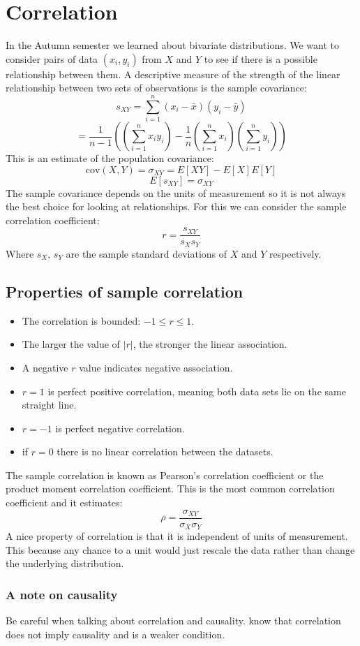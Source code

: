 \documentclass[12pt]{article}
\begin{document}
\section{Correlation}
In the Autumn semester we learned about bivariate distributions. We want to consider pairs of data \((x_i,y_i)\) from \(X\) and \(Y\) to see if there is a possible relationship between them. A descriptive measure of the strength of the linear relationship between two sets of observations is the sample covariance:
\[s_{XY}=\sum^n_{i=1}(x_i-\bar{x})(y_i-\bar{y})\]
\[=\frac{1}{n-1}\left(\left(\sum^n_{i=1}x_iy_i\right)-\frac{1}{n}\left(\sum^n_{i=1}x_i\right)\left(\sum^n_{i=1}y_i\right)\right)\]
This is an estimate of the population covariance:
\[\text{cov}(X,Y)=\sigma_{XY}=E[XY]-E[X]E[Y]\]
\[E[s_{XY}]=\sigma_{XY}\]
The sample covariance depends on the units of measurement so it is not always the best choice for looking at relationships. For this we can consider the sample correlation coefficient:
\[r=\frac{s_{XY}}{s_Xs_{Y}}\]
Where \(s_X,\,s_Y\) are the sample standard deviations of \(X\) and \(Y\) respectively.
\subsection*{Properties of sample correlation}
\begin{itemize}
    \item The correlation is bounded: \(-1\leq r\leq 1\).
    \item The larger the value of \(|r|\), the stronger the linear association.
    \item A negative \(r\) value indicates negative association.
    \item \(r=1\) is perfect positive correlation, meaning both data sets lie on the same straight line.
    \item \(r=-1\) is perfect negative correlation.
    \item if \(r=0\) there is no linear correlation between the datasets.
\end{itemize}
The sample correlation is known as Pearson's correlation coefficient or the product moment correlation coefficient. This is the most common correlation coefficient and it estimates:
\[\rho=\frac{\sigma_{XY}}{\sigma_X\sigma_Y}\]
A nice property of correlation is that it is independent of units of measurement. This because any chance to a unit would just rescale the data rather than change the underlying distribution.
\subsubsection*{A note on causality}
Be careful when talking about correlation and causality. know that correlation does not imply causality and is a weaker condition.
\end{document}
